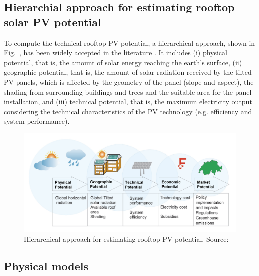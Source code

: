 \subsection{Hierarchial approach for estimating rooftop solar PV potential}
\label{method_solar_hierarchy}

To compute the technical rooftop PV potential,  a hierarchical approach, shown in Fig.~, has been widely accepted in the literature \cite{assouline_quantifying_2017,ramirez_camargo_spatio-temporal_2015,izquierdo_method_2008,wiginton_quantifying_2010}. It includes (i) physical potential, that is, the amount of solar energy reaching the earth’s surface, (ii) geographic potential, that is, the amount of solar radiation received by the tilted PV panels, which is affected by the geometry of the panel (slope and aspect), the shading from surrounding buildings and trees and the suitable area for the panel installation, and (iii) technical potential, that is, the maximum electricity output considering the technical characteristics of the PV technology (e.g. efficiency and system performance).

\begin{figure}[tb]
	\centering
	\includegraphics[width=\linewidth]{images/Figs/hierarchy.png}  
	\caption{Hierarchical approach for estimating rooftop PV potential. Source: \citet{assouline_estimation_2017}}
	\label{fig:solar_hierarchy}
\end{figure}

\subsection{Physical models}
\label{phys_models}

